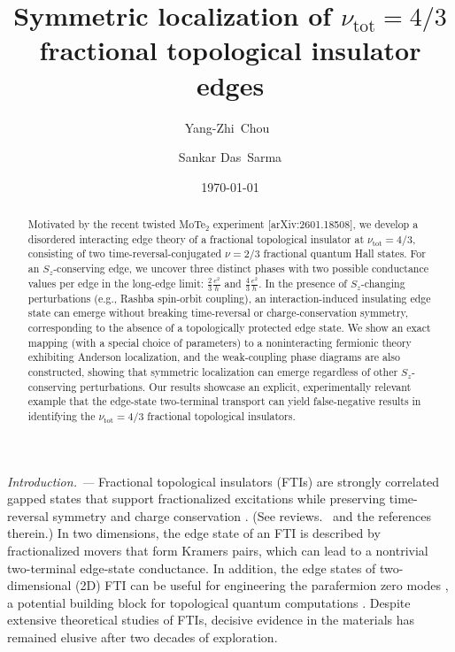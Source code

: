 \documentclass[aps,prx,amsmath,superscriptaddress,twocolumn,bibnotes,longbibliography,floatfix]{revtex4-2}
\begin{document}
	\title{Symmetric localization of $\nu_{\text{tot}}=4/3$ fractional topological insulator edges}

	\author{Yang-Zhi~Chou~}



	\author{Sankar Das~Sarma}

	\date{\today}

	\begin{abstract}
		Motivated by the recent twisted MoTe$_2$ experiment [arXiv:2601.18508], we develop a disordered interacting edge theory of a fractional topological insulator at $\nu_{\text{tot}}=4/3$, consisting of two time-reversal-conjugated $\nu=2/3$ fractional quantum Hall states. For an $S_z$-conserving edge, we uncover three distinct phases with two possible conductance values per edge in the long-edge limit: $\frac{2}{3}\frac{e^2}{h}$ and $\frac{4}{3}\frac{e^2}{h}$. In the presence of $S_z$-changing perturbations (e.g., Rashba spin-orbit coupling), an interaction-induced insulating edge state can emerge without breaking time-reversal or charge-conservation symmetry, corresponding to the absence of a topologically protected edge state. We show an exact mapping (with a special choice of parameters) to a noninteracting fermionic theory exhibiting Anderson localization, and the weak-coupling phase diagrams are also constructed, showing that symmetric localization can emerge regardless of other $S_z$-conserving perturbations. Our results showcase an explicit, experimentally relevant example that the edge-state two-terminal transport can yield false-negative results in identifying the $\nu_{\text{tot}}=4/3$ fractional topological insulators.
	\end{abstract}

	\maketitle

	\textit{Introduction. ---} Fractional topological insulators (FTIs) are strongly correlated gapped states that support fractionalized excitations while preserving time-reversal symmetry and charge conservation \cite{BernevigBA2006a,LevinM2009c,MaciejkoJ2010a}. (See reviews.~\cite{SternA2016,MaciejkoJ2015,NeupertT2015} and the references therein.) In two dimensions, the edge state of an FTI is described by fractionalized movers that form Kramers pairs, which can lead to a nontrivial two-terminal edge-state conductance.
	In addition, the edge states of two-dimensional (2D) FTI can be useful for engineering the parafermion zero modes \cite{ChengM2012,KlinovajaJ2014a}, a potential building block for topological quantum computations \cite{AliceaJ2016}. Despite extensive theoretical studies of FTIs, decisive evidence in the materials has remained elusive after two decades of exploration.
\end{document}
